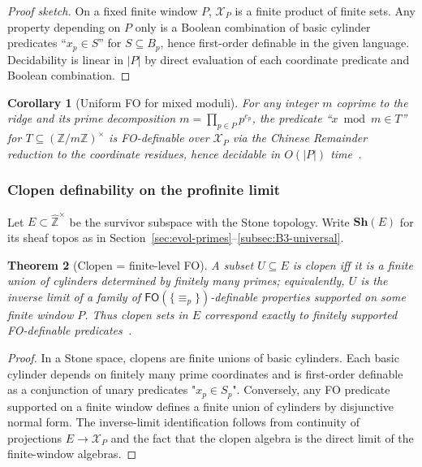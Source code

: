 \documentclass[12pt]{article}
\newtheorem{theorem}{Theorem}[section]
\newtheorem{corollary}[theorem]{Corollary}
\numberwithin{equation}{section}
\newcommand{\Z}{\mathbb{Z}}
\begin{document}
\begin{proof}[Proof sketch]
On a fixed finite window $P$, $\mathscr{X}_P$ is a finite product of finite sets. Any property depending on $P$ only is a Boolean combination of basic cylinder predicates ``$x_p\in S$'' for $S\subseteq B_p$, hence first-order definable in the given language. Decidability is linear in $|P|$ by direct evaluation of each coordinate predicate and Boolean combination.
\end{proof}

\begin{corollary}[Uniform FO for mixed moduli]\label{cor:fo-mixed}
For any integer $m$ coprime to the ridge and its prime decomposition $m=\prod_{p\in P} p^{e_p}$, the predicate ``$x\bmod m\in T$'' for $T\subseteq (\Z/m\Z)^{\times}$ is FO-definable over $\mathscr{X}_P$ via the Chinese Remainder reduction to the coordinate residues, hence decidable in $O(|P|)$ time~\cite{SpivackUGPFormalization,ugp-lean}.
\end{corollary}

\subsubsection{Clopen definability on the profinite limit}\label{subsec:C2-clopen}
Let $E\subset \widehat{\Z}^{\times}$ be the survivor subspace with the Stone topology. Write $\mathbf{Sh}(E)$ for its sheaf topos as in Section~\ref{sec:evol-primes}–\ref{subsec:B3-universal}.

\begin{theorem}[Clopen = finite-level FO]\label{thm:clopen-fo}
A subset $U\subseteq E$ is clopen iff it is a finite union of cylinders determined by finitely many primes; equivalently, $U$ is the inverse limit of a family of $\mathsf{FO}(\{\equiv_p\})$-definable properties supported on some finite window $P$. Thus clopen sets in $E$ correspond exactly to finitely supported FO-definable predicates~\cite{SpivackUGPFormalization,ugp-lean}.
\end{theorem}

\begin{proof}
In a Stone space, clopens are finite unions of basic cylinders. Each basic cylinder depends on finitely many prime coordinates and is first-order definable as a conjunction of unary predicates "$x_p\in S_p$". Conversely, any FO predicate supported on a finite window defines a finite union of cylinders by disjunctive normal form. The inverse-limit identification follows from continuity of projections $E\to \mathscr{X}_P$ and the fact that the clopen algebra is the direct limit of the finite-window algebras.
\end{proof}
\end{document}
